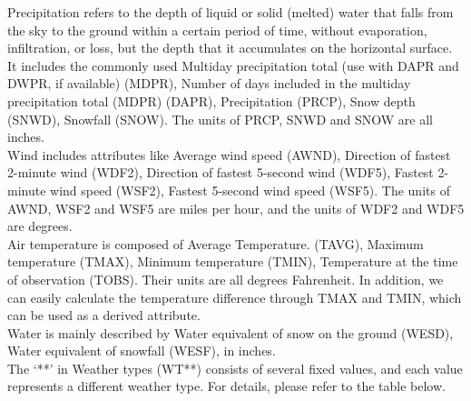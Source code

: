\documentclass[]{article}
\begin{document}
	\noindent Precipitation refers to the depth of liquid or solid (melted) water that falls from the sky to the ground within a certain period of time, without evaporation, infiltration, or loss, but the depth that it accumulates on the horizontal surface. It includes the commonly used Multiday precipitation total (use with DAPR and DWPR, if available) (MDPR), Number of days included in the multiday precipitation total (MDPR) (DAPR), Precipitation (PRCP), Snow depth (SNWD), Snowfall (SNOW). The units of PRCP, SNWD and SNOW are all inches. \\
	
	\noindent Wind includes attributes like Average wind speed (AWND), Direction of fastest 2-minute wind (WDF2), Direction of fastest 5-second wind (WDF5), Fastest 2-minute wind speed (WSF2), Fastest 5-second wind speed (WSF5). The units of AWND, WSF2 and WSF5 are miles per hour, and the units of WDF2 and WDF5 are degrees.  \\
	
	\noindent Air temperature is composed of Average Temperature. (TAVG), Maximum temperature (TMAX), Minimum temperature (TMIN), Temperature at the time of observation (TOBS). Their units are all degrees Fahrenheit. In addition, we can easily calculate the temperature difference through TMAX and TMIN, which can be used as a derived attribute.   \\
	
	\noindent Water is mainly described by Water equivalent of snow on the ground (WESD), Water equivalent of snowfall (WESF), in inches.   \\
	
	\noindent The ‘**’ in Weather types (WT**) consists of several fixed values, and each value represents a different weather type. For details, please refer to the table below. \\
	
\end{document}

